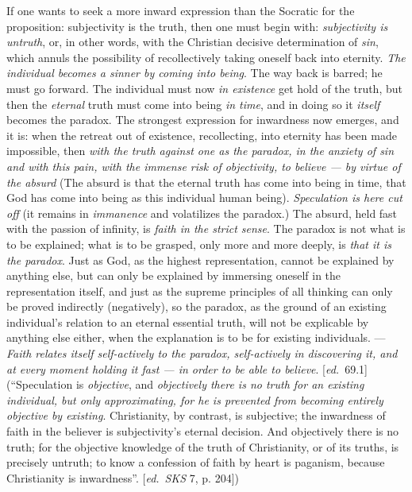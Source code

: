 \documentclass[12pt,a4paper,openany]{book}
\newcommand{\kpage}[1]{\marginnote{\footnotesize\textit{[#1]}}}
\newcommand{\ed}[1]{{\small[\textit{ed.}\ #1]}}
\begin{document}
\kpage{120}If one wants to seek a more inward expression than the Socratic for the
proposition: subjectivity is the truth, then one must begin with:
\emph{subjectivity is untruth}, or, in other words, with the Christian
decisive determination of \emph{sin}, which annuls the possibility of recollectively
taking oneself back into eternity. \emph{The individual becomes a sinner by coming
into being}. The way back is barred; he must go forward. The individual must now \emph{in
existence} get hold of the truth, but then the \emph{eternal} truth must
come into being \emph{in time}, and in doing so it \emph{itself} becomes the paradox. The
strongest expression for inwardness now emerges, and it is:
when the retreat out of existence, recollecting, into eternity has been made
impossible, then \emph{with the truth against one as the paradox, in the anxiety of sin and with
this pain, with the immense risk of objectivity, to believe --- by virtue of the absurd}
(The absurd is that the eternal truth has come into being in time, that God
has come into being as this individual human being). \emph{Speculation is here cut off}
(it remains in \emph{immanence} and volatilizes the paradox.) The absurd,
held fast with the passion of infinity, is \emph{faith in the strict sense}. The paradox
is not what is to be explained; what is to be grasped, only more and more
deeply, is \emph{that it is the paradox}. Just as God, as the highest representation,
cannot be explained by anything else, but can only be explained by
immersing oneself in the representation itself, and just as the supreme principles
of all thinking can only be proved indirectly (negatively), so the
paradox, as the ground of an existing individual's relation to an eternal essential
truth, will not be explicable by anything else either, when
the explanation is to be for existing individuals. --- \emph{Faith relates itself self-actively
to the paradox, self-actively in discovering it, and at every moment holding it fast --- in order to
be able to believe}. \ed{69.1} (``Speculation is \emph{objective}, and \emph{objectively there is no
truth for an existing individual, but only approximating, for he is prevented from becoming entirely objective
by existing}. Christianity, by contrast, is subjective;
the inwardness of faith in the believer is subjectivity's eternal decision.
And objectively there is no truth; for the objective knowledge
of the truth of Christianity, or of its truths, is precisely
untruth; to know a confession of faith by heart is paganism,
because Christianity is inwardness''. \ed{\emph{SKS} 7, p. 204})
\end{document}
